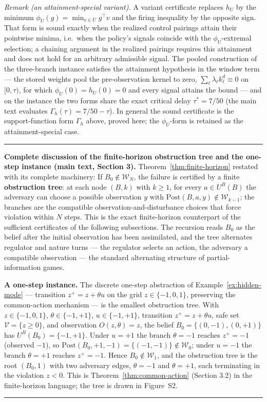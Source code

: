 \documentclass[11pt]{article}
\theoremstyle{definition}
\begin{document}
\emph{Remark (an attainment-special variant).} A variant certificate
replaces \(h_{U}\) by the minimum \(\phi_{U}(g) = \min_{v \in U}
g^{\top} v\) and the firing inequality by the opposite sign. That form
is sound exactly when the realized control pairings attain their
pointwise minima, i.e.\ when the policy's signals coincide with the
\(\phi_{U}\)-extremal selection; a chaining argument in the realized
pairings requires this attainment and does not hold for an arbitrary
admissible signal. The pooled construction of the three-branch instance satisfies
the attainment hypothesis in the window term --- the stored weights
pool the pre-observation kernel to zero, \(\sum_{\ell}
\lambda_{\ell} k_{\ell}^{d} \equiv 0\) on \([0, \tau)\), for which
\(\phi_{U}(0) = h_{U}(0) = 0\) and every signal attains the bound --- and on the instance the two forms share the exact critical delay
\(\tau^{*} = 7/50\) (the main text evaluates \(\Gamma_{h}(\tau) = 7/50 - \tau\)). In general the sound
certificate is the support-function form \(\Gamma_{h}\) above, proved
here; the \(\phi_{U}\)-form is retained as the attainment-special case.
\rule{0.5\linewidth}{0.5pt}

\bigskip
\noindent\textbf{Complete discussion of the finite-horizon obstruction tree and the one-step instance (main text, Section 3).}
Theorem~\ref{thm:finite-horizon} restated with its complete machinery:
If \(B_0\notin\mathcal W_N\), the failure is certified by a finite
\textbf{obstruction tree}: at each node \((B,k)\) with \(k\ge1\), for
every \(a\in U^B(B)\) the adversary can choose a possible observation
\(y\) with \(\mathrm{Post}(B,a,y)\notin\mathcal W_{k-1}\); the branches
are the compatible observation-and-disturbance choices that force
violation within \(N\) steps. This is the exact finite-horizon
counterpart of the sufficient certificates of the following subsections. The recursion reads \(B_0\) as the belief after the
initial observation has been assimilated, and the tree alternates
regulator and nature turns --- the regulator selects an action, the
adversary a compatible observation --- the standard alternating
structure of partial-information games.

\textbf{A one-step instance.} The discrete one-step abstraction of
Example~\ref{ex:hidden-mode} --- transition \(z^+ = z + \theta u\) on
the grid \(z \in \{-1,0,1\}\), preserving the common-action mechanism
--- is the smallest obstruction tree. With
\(z\in\{-1,0,1\}\), \(\theta\in\{-1,+1\}\), \(u\in\{-1,+1\}\),
transition \(z^+=z+\theta u\), safe set \(\mathcal V=\{z\ge 0\}\), and
observation \(O(z,\theta)=z\), the belief \(B_0=\{(0,-1),(0,+1)\}\) has
\(U^B(B_0)=\{-1,+1\}\). Under \(u=+1\) the branch \(\theta=-1\) reaches
\(z^+=-1\) (observed \(-1\)), so
\(\mathrm{Post}(B_0,+1,-1)=\{(-1,-1)\}\notin\mathcal W_0\); under
\(u=-1\) the branch \(\theta=+1\) reaches \(z^+=-1\). Hence
\(B_0\notin\mathcal W_1\), and the obstruction tree is the root
\((B_0,1)\) with two adversary edges, \(\theta=-1\) and \(\theta=+1\),
each terminating in the violation \(z<0\). This is
Theorem~\ref{thm:common-action} (Section 3.2) in the finite-horizon language; the tree is drawn in Figure~S2.
\rule{0.5\linewidth}{0.5pt}
\end{document}

